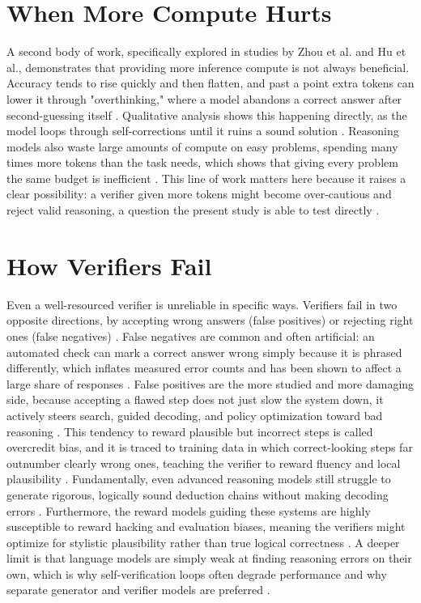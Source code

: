 \documentclass[12pt, a4paper, oneside]{report}
\begin{document}
\section{When More Compute Hurts}
A second body of work, specifically explored in studies by Zhou et al. and Hu et al., demonstrates that providing more inference compute is not always beneficial. Accuracy tends to rise quickly and then flatten, and past a point extra tokens can lower it through "overthinking," where a model abandons a correct answer after second-guessing itself \parencite{Zhou2026, Almaghrabi2026}. Qualitative analysis shows this happening directly, as the model loops through self-corrections until it ruins a sound solution \parencite{Zhou2026}. Reasoning models also waste large amounts of compute on easy problems, spending many times more tokens than the task needs, which shows that giving every problem the same budget is inefficient \parencite{Almaghrabi2026, Singhi2025}. This line of work matters here because it raises a clear possibility: a verifier given more tokens might become over-cautious and reject valid reasoning, a question the present study is able to test directly \parencite{Zhou2026, Hu2026}.

\section{How Verifiers Fail}
Even a well-resourced verifier is unreliable in specific ways. Verifiers fail in two opposite directions, by accepting wrong answers (false positives) or rejecting right ones (false negatives) \parencite{Xu2025}. False negatives are common and often artificial: an automated check can mark a correct answer wrong simply because it is phrased differently, which inflates measured error counts and has been shown to affect a large share of responses \parencite{Xu2025}. False positives are the more studied and more damaging side, because accepting a flawed step does not just slow the system down, it actively steers search, guided decoding, and policy optimization toward bad reasoning \parencite{Khalifa2025}. This tendency to reward plausible but incorrect steps is called overcredit bias, and it is traced to training data in which correct-looking steps far outnumber clearly wrong ones, teaching the verifier to reward fluency and local plausibility \parencite{Xu2025}. Fundamentally, even advanced reasoning models still struggle to generate rigorous, logically sound deduction chains without making decoding errors \parencite{Su2025}. Furthermore, the reward models guiding these systems are highly susceptible to reward hacking and evaluation biases, meaning the verifiers might optimize for stylistic plausibility rather than true logical correctness \parencite{Pan2026}.
A deeper limit is that language models are simply weak at finding reasoning errors on their own, which is why self-verification loops often degrade performance and why separate generator and verifier models are preferred \parencite{Stechly2024, Zhao2025}.
\end{document}
